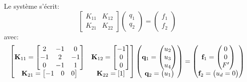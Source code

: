 Le système s'écrit:
\begin{equation}
\begin{bmatrix} K_{11} & K_{12}\\ K_{21} & K_{22} \end{bmatrix}
\begin{pmatrix} q_1\\ q_2 \end{pmatrix} =
\begin{pmatrix} f_1\\ f_2 \end{pmatrix} 
\end{equation}
avec:
\begin{equation*}
\begin{bmatrix}
\mathbf{K}_{11}=\begin{bmatrix} 2 & -1 & 0 \\ -1 & 2 & -1\\ 0 & -1 & 1 \end{bmatrix} &
\mathbf{K}_{12}=\begin{bmatrix}-1 \\ 0\\ 0 \end{bmatrix}\\
\mathbf{K}_{21}=\begin{bmatrix} -1 & 0 & 0 \end{bmatrix} &
\mathbf{K}_{22} =[1]
\end{bmatrix}
\begin{pmatrix} \mathbf{q}_1=\begin{pmatrix} u_2\\u_3\\u_4 \end{pmatrix}\\
\mathbf{q}_2 =\begin{pmatrix} u_1 \end{pmatrix}\end{pmatrix}
=
\begin{pmatrix} \mathbf{f}_1 =\begin{pmatrix} 0\\0\\F' \end{pmatrix}\\ 
\mathbf{f}_2=\begin{pmatrix} u_d=0 \end{pmatrix}\end{pmatrix}
\end{equation*}
